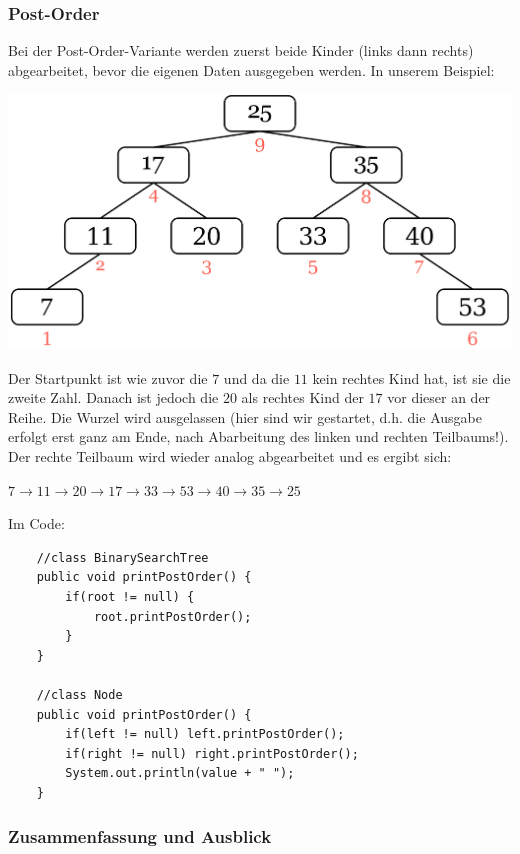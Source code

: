 \documentclass{article}
\begin{document}
\subsubsection{Post-Order}
Bei der Post-Order-Variante werden zuerst beide Kinder (links dann rechts) abgearbeitet, bevor die eigenen Daten ausgegeben werden. In unserem Beispiel: 
\begin{center}
    \includegraphics[scale=0.2]{../media/postorder.png}
\end{center}
Der Startpunkt ist wie zuvor die $7$ und da die $11$ kein rechtes Kind hat, ist sie die zweite Zahl. Danach ist jedoch die $20$ als rechtes Kind der $17$ vor dieser an der Reihe. Die Wurzel wird ausgelassen (hier sind wir gestartet, d.h. die Ausgabe erfolgt erst ganz am Ende, nach Abarbeitung des linken und rechten Teilbaums!). Der rechte Teilbaum wird wieder analog abgearbeitet und es ergibt sich:
\begin{center}
    $7 \rightarrow 11 \rightarrow 20 \rightarrow 17 \rightarrow 33 \rightarrow 53 \rightarrow 40 \rightarrow 35 \rightarrow 25$
\end{center}
Im Code:
\begin{verbatim}
    //class BinarySearchTree
    public void printPostOrder() {
        if(root != null) {
            root.printPostOrder();
        }
    }

    //class Node 
    public void printPostOrder() {
        if(left != null) left.printPostOrder();
        if(right != null) right.printPostOrder();
        System.out.println(value + " ");
    }
\end{verbatim} 

\subsubsection{Zusammenfassung und Ausblick}
\end{document}
